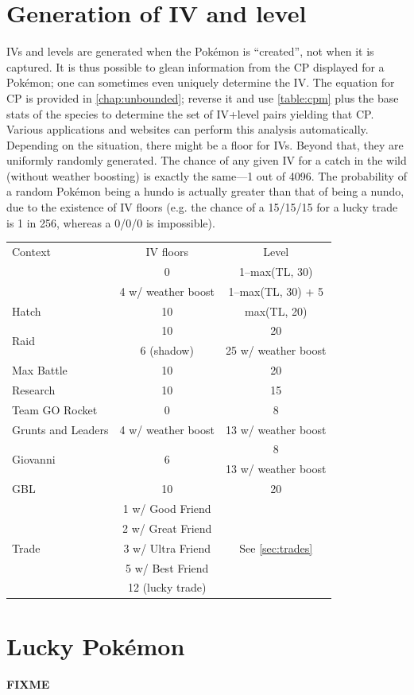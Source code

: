 \section{Generation of IV and level}
\label{sec:ivgeneration}
IVs and levels are generated when the Pokémon is ``created'', not when it is captured.
It is thus possible to glean information from the CP displayed for a Pokémon;
  one can sometimes even uniquely determine the IV\@.
The equation for CP is provided in \autoref{chap:unbounded}; reverse it and
  use \autoref{table:cpm} plus the base stats of the species to determine
  the set of IV+level pairs yielding that CP\@.
Various applications and websites can perform this analysis automatically.
Depending on the situation, there might be a floor for IVs.
Beyond that, they are uniformly randomly generated.
The chance of any given IV for a catch in the wild (without weather boosting)
  is exactly the same---1 out of 4096.
The probability of a random Pokémon being a hundo is actually
  greater than that of being a nundo, due to the existence of IV floors
  (e.g. the chance of a 15/15/15 for a lucky trade is 1 in 256, whereas
  a 0/0/0 is impossible).
\begin{table}
  \begin{center}
    \begin{tabular}{lcc}
      Context & IV floors & Level \\
      \Midrule
      \multirow{2}{*}{Wild catch} & 0 & 1--max(TL, 30) \\
      & 4 w/ weather boost & 1--max(TL, 30) + 5 \\
      Hatch & 10 & max(TL, 20) \\
      \multirow{2}{*}{Raid} & 10 & 20 \\
      & 6 (shadow) & 25 w/ weather boost \\
      Max Battle & 10 & 20 \\
      Research & 10 & 15 \\
      Team GO Rocket & 0 & 8 \\
      Grunts and Leaders & 4 w/ weather boost & 13 w/ weather boost \\
      \multirow{2}{*}{Giovanni} & \multirow{2}{*}{6} & 8\\
       & & 13 w/ weather boost\\
      GBL & 10 & 20\\
      \multirow{5}{*}{Trade} & 1 w/ Good Friend & \multirow{5}{*}{See \autoref{sec:trades}} \\
       & 2 w/ Great Friend & \\
       & 3 w/ Ultra Friend & \\
       & 5 w/ Best Friend & \\
       & 12 (lucky trade) & \\
    \end{tabular}
  \end{center}
\end{table}

\section{Lucky Pokémon}
\label{sec:lucky}
\textbf{FIXME}
